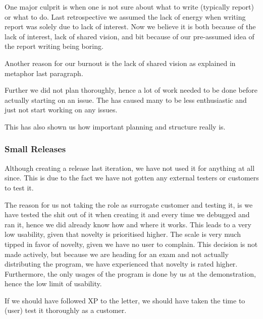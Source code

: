 One major culprit is when one is not sure about what to write (typically report) or what to do.
Last retrospective we assumed the lack of energy when writing report was solely due to lack of interest. Now we believe it is both because of the lack of interest, lack of shared vision, and bit because of our pre-assumed idea of the report writing being boring.

Another reason for our burnout is the lack of shared vision as explained in metaphor last paragraph.

Further we did not plan thoroughly, hence a lot of work needed to be done before actually starting on an issue. The has caused many to be less enthusiastic and just not start working on any issues.

This has also shown us how important planning and structure really is.

\subsubsection{Small Releases}
Although creating a release last iteration, we have not used it for anything at all since. This is due to the fact we have not gotten any external testers or customers to test it.

The reason for us not taking the role as surrogate customer and testing it, is we have tested the shit out of it when creating it and every time we debugged and ran it, hence we did already know how and where it works.\linebreak
This leads to a very low usability, given that novelty is prioritised higher. The scale is very much tipped in favor of novelty, given we have no user to complain.\linebreak {}
This decision is not made actively, but because we are heading for an exam and not actually distributing the program, we have experienced that novelty is rated higher.\linebreak
Furthermore, the only usages of the program is done by us at the demonstration, hence the low limit of usability.

If we should have followed XP to the letter, we should have taken the time to (user) test it thoroughly as a customer.

